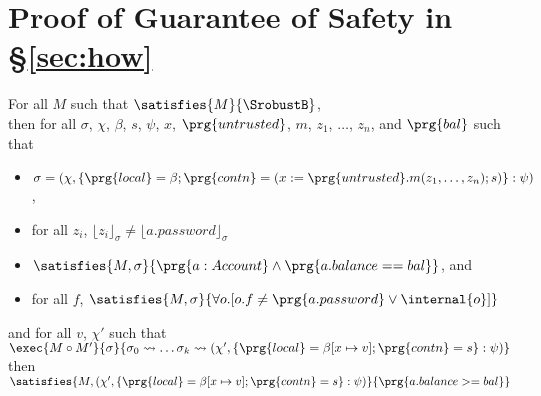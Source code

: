 \section{Proof of Guarantee of Safety in \S\ref{sec:how}}

\begin{lemma}
For all $M$ such that $\satisfies{M}{{\SrobustB}}$,\\
then for all $\sigma$, $\chi$, $\beta$, $s$, $\psi$, $x$, $\prg{untrusted}$, $m$, $z_1$, $\ldots$, $z_n$, and $\prg{bal}$ such that
\begin{itemize} 
\item
$\sigma = (\chi, \{\prg{local} = \beta; \prg{contn} = (x := \prg{untrusted}.m(z_1, \ldots, z_n); s)\} : \psi)$,
\item
for all $z_i$, $\lfloor z_i \rfloor_\sigma \neq \lfloor a.password \rfloor_\sigma$
\item
$\satisfies{M, \sigma}{\prg{a : Account} \wedge \prg{a.balance == bal}}$, and
\item
for all $f$, $\satisfies{M, \sigma}{\forall o.[o.f \neq \prg{a.password} \vee \internal{o}]}$
\end{itemize}
and for all $v$, $\chi'$ such that $\exec{M \circ M'}{\sigma}{\sigma_0 \leadsto \ldots \sigma_k \leadsto (\chi', \{\prg{local} = \beta[x \mapsto v]; \prg{contn} = s\} : \psi)}$\\
then $\satisfies{M, (\chi', \{\prg{local} = \beta[x \mapsto v]; \prg{contn} = s\} : \psi)}{\prg{a.balance >= bal}}$
\end{lemma}

